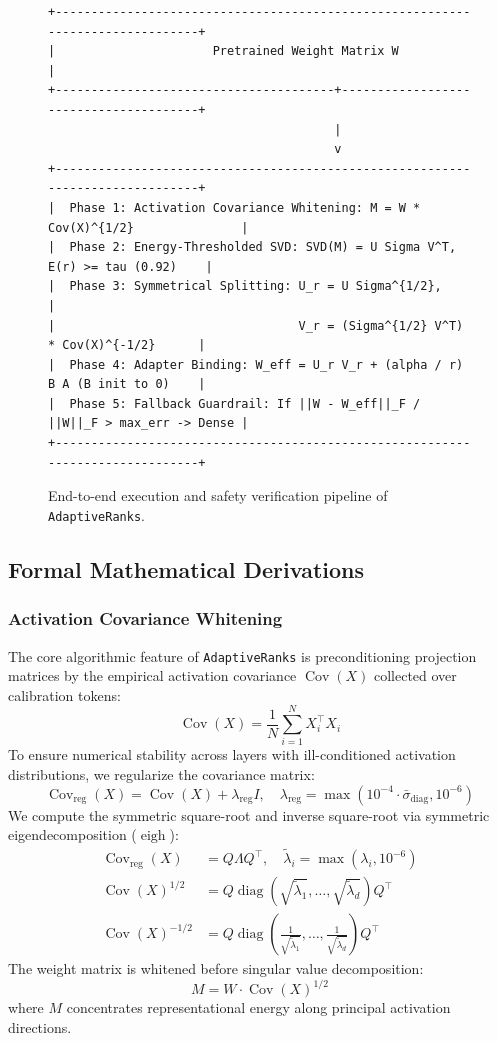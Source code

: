 \begin{figure}[t]
\centering
\begin{verbatim}
+-------------------------------------------------------------------------------+
|                      Pretrained Weight Matrix W                               |
+---------------------------------------+---------------------------------------+
                                        |
                                        v
+-------------------------------------------------------------------------------+
|  Phase 1: Activation Covariance Whitening: M = W * Cov(X)^{1/2}               |
|  Phase 2: Energy-Thresholded SVD: SVD(M) = U Sigma V^T, E(r) >= tau (0.92)    |
|  Phase 3: Symmetrical Splitting: U_r = U Sigma^{1/2},                         |
|                                  V_r = (Sigma^{1/2} V^T) * Cov(X)^{-1/2}      |
|  Phase 4: Adapter Binding: W_eff = U_r V_r + (alpha / r) B A (B init to 0)    |
|  Phase 5: Fallback Guardrail: If ||W - W_eff||_F / ||W||_F > max_err -> Dense |
+-------------------------------------------------------------------------------+
\end{verbatim}
\caption{End-to-end execution and safety verification pipeline of \texttt{AdaptiveRanks}.}
\end{figure}

\subsection{Formal Mathematical Derivations}

\subsubsection{Activation Covariance Whitening}
\label{sec:covariance_whitening}
The core algorithmic feature of \texttt{AdaptiveRanks} is preconditioning projection matrices by the empirical activation covariance $\operatorname{Cov}(X)$ collected over calibration tokens:
\[
\operatorname{Cov}(X) = \frac{1}{N} \sum_{i=1}^N X_i^\top X_i
\]
To ensure numerical stability across layers with ill-conditioned activation distributions, we regularize the covariance matrix:
\[
\operatorname{Cov}_{\text{reg}}(X) = \operatorname{Cov}(X) + \lambda_{\text{reg}} I, \quad \lambda_{\text{reg}} = \max(10^{-4} \cdot \bar{\sigma}_{\text{diag}}, 10^{-6})
\]
We compute the symmetric square-root and inverse square-root via symmetric eigendecomposition ($\operatorname{eigh}$):
\begin{align}
\operatorname{Cov}_{\text{reg}}(X) &= Q \Lambda Q^\top, \quad \tilde{\lambda}_i = \max(\lambda_i, 10^{-6}) \\
\operatorname{Cov}(X)^{1/2} &= Q \operatorname{diag}\left(\sqrt{\tilde{\lambda}_1}, \dots, \sqrt{\tilde{\lambda}_d}\right) Q^\top \\
\operatorname{Cov}(X)^{-1/2} &= Q \operatorname{diag}\left(\frac{1}{\sqrt{\tilde{\lambda}_1}}, \dots, \frac{1}{\sqrt{\tilde{\lambda}_d}}\right) Q^\top
\end{align}
The weight matrix is whitened before singular value decomposition:
\[
M = W \cdot \operatorname{Cov}(X)^{1/2}
\]
where $M$ concentrates representational energy along principal activation directions.

